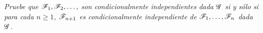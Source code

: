 \emph{
	Pruebe que $\mathscr{F}_1,\mathscr{F}_2,\ldots, $ son condicionalmente independientes dada 
	$\mathscr{G}$ si y s\'olo si para cada $n\geq 1$, $\mathscr{F}_{n+1}$ es condicionalmente 
	independiente de $\mathscr{F}_1,\ldots, \mathscr{F}_n$ dada $\mathscr{G}$. 
}